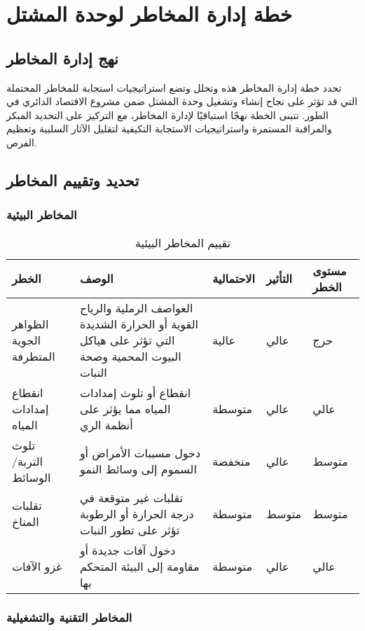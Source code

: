 \section{خطة إدارة المخاطر لوحدة المشتل}

\subsection{نهج إدارة المخاطر}
تحدد خطة إدارة المخاطر هذه وتحلل وتضع استراتيجيات استجابة للمخاطر المحتملة التي قد تؤثر على نجاح إنشاء وتشغيل وحدة المشتل ضمن مشروع الاقتصاد الدائري في الطور. تتبنى الخطة نهجًا استباقيًا لإدارة المخاطر، مع التركيز على التحديد المبكر والمراقبة المستمرة واستراتيجيات الاستجابة التكيفية لتقليل الآثار السلبية وتعظيم الفرص.

\subsection{تحديد وتقييم المخاطر}

\subsubsection{المخاطر البيئية}

\begin{table}[h]
\centering
\begin{tabular}{|p{4cm}|p{4cm}|p{2cm}|p{2cm}|p{3cm}|}
\hline
\textbf{الخطر} & \textbf{الوصف} & \textbf{الاحتمالية} & \textbf{التأثير} & \textbf{مستوى الخطر} \\
\hline
الظواهر الجوية المتطرفة & العواصف الرملية والرياح القوية أو الحرارة الشديدة التي تؤثر على هياكل البيوت المحمية وصحة النبات & عالية & عالي & حرج \\
\hline
انقطاع إمدادات المياه & انقطاع أو تلوث إمدادات المياه مما يؤثر على أنظمة الري & متوسطة & عالي & عالي \\
\hline
تلوث التربة/الوسائط & دخول مسببات الأمراض أو السموم إلى وسائط النمو & منخفضة & عالي & متوسط \\
\hline
تقلبات المناخ & تقلبات غير متوقعة في درجة الحرارة أو الرطوبة تؤثر على تطور النبات & متوسطة & متوسط & متوسط \\
\hline
غزو الآفات & دخول آفات جديدة أو مقاومة إلى البيئة المتحكم بها & متوسطة & عالي & عالي \\
\hline
\end{tabular}
\caption{تقييم المخاطر البيئية}
\end{table}

\subsubsection{المخاطر التقنية والتشغيلية}

